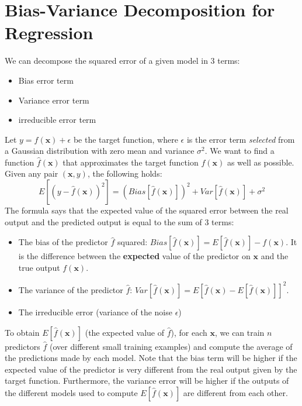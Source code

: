 \section{Bias-Variance Decomposition for Regression}
We can decompose the squared error of a given model in 3 terms:
\begin{itemize}
    \item Bias error term
    \item Variance error term
    \item irreducible error term
\end{itemize}
Let $y = f(\textbf{x}) + \epsilon$ be the target function, where $\epsilon$ is the error term \textit{selected} from a Gaussian distribution with zero mean and variance $\sigma^{2}$. We want to find a function $\hat{f}(\textbf{x})$ that approximates the target function $f(\textbf{x})$ as well as possible.\newline\newline
Given any pair $(\textbf{x}, y)$, the following holds:
\[E[(y-\hat{f}(\textbf{x}))^{2}] = (Bias[\hat{f}(\textbf{x})])^{2} + Var[\hat{f}(\textbf{x})] + \sigma^{2}\]
The formula says that the expected value of the squared error between the real output and the predicted output is equal to the sum of 3 terms:
\begin{itemize}
    \item The bias of the predictor $\hat{f}$ squared: $Bias[\hat{f}(\textbf{x})] = E[\hat{f}(\textbf{x})] - f(\textbf{x})$. It is the difference between the \textbf{expected} value of the predictor on $\textbf{x}$ and the true output $f(\textbf{x})$.
    
    \item The variance of the predictor $\hat{f}$: $Var[\hat{f}(\textbf{x})] = E[\hat{f}(\textbf{x}) - E[\hat{f}(\textbf{x})]]^{2}$.
    
    \item The irreducible error (variance of the noise $\epsilon$)
\end{itemize}
To obtain $E[\hat{f}(\textbf{x})]$ (the expected value of $\hat{f}$), for each $\textbf{x}$, we can train $n$ predictors $\hat{f}$ (over different small training examples) and compute the average of the predictions made by each model.\newline\newline
Note that the bias term will be higher if the expected value of the predictor is very different from the real output given by the target function. Furthermore, the variance error will be higher if the outputs of the different models used to compute $E[\hat{f}(\textbf{x})]$ are different from each other.\newline\newline
